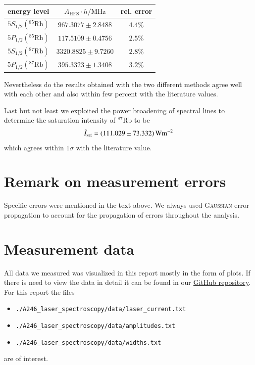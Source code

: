 \documentclass[11pt,a4paper,notitlepage]{scrartcl}
\begin{document}
\begin{center}
		\begin{tabular}{c|c|c}
		\toprule
		energy level & $A_\text{HFS} \cdot h / \si{\mega \Hz} $ & rel. error \\
		\hline
		$5S_{1/2}(^{85}\text{Rb})$& $ 967.3077\pm2.8488$& $4.4\%$\\
		$5P_{1/2}(^{85}\text{Rb})$& $ 117.5109\pm0.4756$& $2.5\%$\\
		$5S_{1/2}(^{87}\text{Rb})$& $ 3320.8825\pm 9.7260$& $2.8\%$\\
		$5P_{1/2}(^{87}\text{Rb})$& $ 395.3323\pm1.3408$& $3.2\%$\\
		\bottomrule
	\end{tabular}
\end{center}
 Nevertheless do the results obtained with the two different methods agree well with each other and also within few percent with the literature values. 
 
 Last but not least we exploited the power broadening of spectral lines to determine the saturation intensity of $^{87}$Rb to be
 $$\tilde{I}_\text{sat}=\SI{111.029\pm73.332}{\W\m^{-2}}$$ which agrees within $1\sigma$ with the literature value.



\label{sec:conc}
\newpage
\printbibliography[heading=bibintoc]

\appendix
\setcounter{figure}{0}
\setcounter{table}{0}
\newpage

\section{Remark on measurement errors}
Specific errors were mentioned in the text above. We always used \textsc{Gaussian} error propagation to account for the propagation of errors throughout the analysis.
\section{Measurement data}
All data we measured was visualized in this report mostly in the form of plots. If there is need to view the data in detail it can be found in our \href{https://github.com/krausejm/advanced_lab_course}{GitHub repository}. For this report the files \begin{itemize}
	\item \texttt{./A246\_laser\_spectroscopy/data/laser\_current.txt}
	\item \texttt{./A246\_laser\_spectroscopy/data/amplitudes.txt}
	\item \texttt{./A246\_laser\_spectroscopy/data/widths.txt}
\end{itemize}
are of interest.
\end{document}
